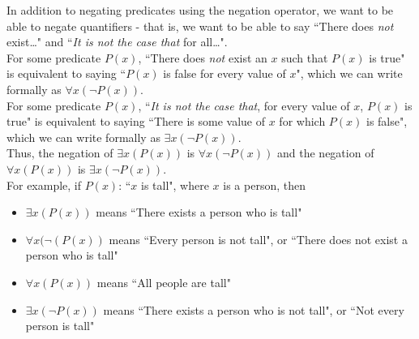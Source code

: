 \documentclass{article}
\begin{document}
In addition to negating predicates using the negation operator, we want to be able to negate quantifiers - that is, we want to be able to say ``There does \textit{not} exist\ldots" and ``\textit{It is not the case that} for all\ldots".\\[1ex]
For some predicate $P(x)$, ``There does \textit{not} exist an $x$ such that $P(x)$ is true" is equivalent to saying ``$P(x)$ is false for every value of $x$", which we can write formally as $\forall x(\neg P(x))$.\\[1ex]
For some predicate $P(x)$, ``\textit{It is not the case that}, for every value of $x$, $P(x)$ is true" is equivalent to saying ``There is some value of $x$ for which $P(x)$ is false", which we can write formally as $\exists x(\neg P(x))$.\\[1ex]
Thus, the negation of $\exists x(P(x))$ is $\forall x(\neg P(x))$ and the negation of $\forall x(P(x))$ is $\exists x(\neg P(x))$.\\[1em]
For example, if $P(x)$: ``$x$ is tall", where $x$ is a person, then
\begin{itemize}
\item $\exists x(P(x))$ means ``There exists a person who is tall"
\item $\forall x(\neg(P(x))$ means ``Every person is not tall", or ``There does not exist a person who is tall"
\item $\forall x(P(x))$ means ``All people are tall"
\item $\exists x(\neg P(x))$ means ``There exists a person who is not tall", or ``Not every person is tall"
\end{itemize}
\end{document}
